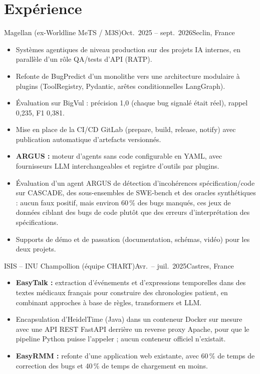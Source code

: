 \documentclass[french]{resume}
\begin{document}
\section{Expérience}
  {Magellan (ex-Worldline MeTS / M3S)}{Oct.\ 2025 -- sept.\ 2026}{Seclin, France}
\begin{itemize}
  \item Systèmes agentiques de niveau production sur des projets IA internes, en parallèle d'un rôle QA/tests d'API (RATP).
  \item Refonte de BugPredict d'un monolithe vers une architecture modulaire à plugins (ToolRegistry, Pydantic, arêtes conditionnelles LangGraph).
  \item Évaluation sur BigVul : précision 1,0 (chaque bug signalé était réel), rappel 0,235, F1 0,381.
  \item Mise en place de la CI/CD GitLab (prepare, build, release, notify) avec publication automatique d'artefacts versionnés.
  \item \textbf{ARGUS :} moteur d'agents sans code configurable en YAML, avec fournisseurs LLM interchangeables et registre d'outils par plugins.
  \item Évaluation d'un agent ARGUS de détection d'incohérences spécification/code sur CASCADE, des sous-ensembles de SWE-bench et des oracles synthétiques : aucun faux positif, mais environ 60\,\% des bugs manqués, ces jeux de données ciblant des bugs de code plutôt que des erreurs d'interprétation des spécifications.
  \item Supports de démo et de passation (documentation, schémas, vidéo) pour les deux projets.
\end{itemize}
  {ISIS – INU Champollion (équipe CHART)}{Avr.\ -- juil.\ 2025}{Castres, France}
\begin{itemize}
  \item \textbf{EasyTalk :} extraction d'événements et d'expressions temporelles dans des textes médicaux français pour construire des chronologies patient, en combinant approches à base de règles, transformers et LLM.
  \item Encapsulation d'HeidelTime (Java) dans un conteneur Docker sur mesure avec une API REST FastAPI derrière un reverse proxy Apache, pour que le pipeline Python puisse l'appeler ; aucun conteneur officiel n'existait.
  \item \textbf{EasyRMM :} refonte d'une application web existante, avec 60\,\% de temps de correction des bugs et 40\,\% de temps de chargement en moins.
\end{itemize}
\end{document}
